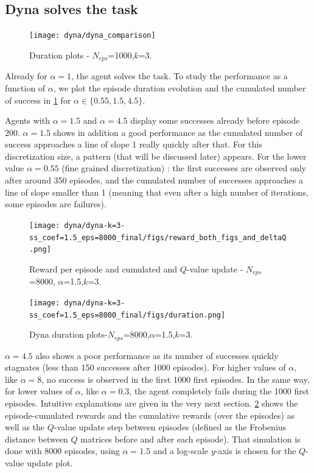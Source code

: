 \documentclass[a4paper, 12pt,oneside]{article}
\begin{document}
        \subsection{Dyna solves the task}
        \begin{figure}
            \centering
            \vspace{-3em}
            \texttt{[image: dyna/dyna\_comparison]}
            \caption{Duration plots - $N_{eps}$=1000,$k$=3.  }
            \label{dyna-comparison}
        \end{figure}
        Already for $\alpha=1$, the agent solves the task. 
        To study the performance as a function of $\alpha$, we plot the episode duration evolution and the cumulated number of success in \ref{dyna-comparison} for $\alpha\in\{0.55,1.5,4.5\}$. 
        
        Agents with $\alpha=1.5$ and $\alpha=4.5$ display some successes already before episode 200. $\alpha=1.5$ shows in addition a good performance as the cumulated number of success approaches a line of slope 1 really quickly after that. For this discretization size, a pattern (that will be discussed later) appears. For the lower value $\alpha=0.55$ (fine grained discretization) : the first successes are observed only after around 350 episodes, and the cumulated number of successes approaches a line of slope smaller than 1 (meaning that even after a high number of iterations, some episodes are failures). 
        \begin{figure}[h]
            \centering
            \texttt{[image: dyna/dyna-k=3-ss\_coef=1.5\_eps=8000\_final/figs/reward\_both\_figs\_and\_deltaQ.png]}
            \caption{Reward per episode and cumulated and $Q$-value update - $N_{eps}$=8000, $\alpha$=1.5,$k$=3.}
            \label{fig:reward-both-figs-and-deltaQ}
        \end{figure}

        \begin{figure}
            \centering
            \texttt{[image: dyna/dyna-k=3-ss\_coef=1.5\_eps=8000\_final/figs/duration.png]}
            \caption{Dyna duration plots-$N_{eps}$=8000,$\alpha$=1.5,$k$=3.}
            \label{long-duration}
        \end{figure}
        $\alpha=4.5$ also shows a poor performance as its number of successes quickly stagnates (less than 150 successes after 1000 episodes). 
        For higher values of $\alpha$, like $\alpha=8$, no success is observed in the first 1000 first episodes. In the same way, for lower values of $\alpha$, like $\alpha=0.3$, the agent completely fails during the 1000 first episodes. Intuitive explanations are given in the very next section.  
        \ref{fig:reward-both-figs-and-deltaQ} shows the episode-cumulated rewards and the cumulative rewards (over the episodes) as well as the $Q$-value update step between episodes (defined as the Frobenius distance between $Q$ matrices before and after each episode). That simulation is done with 8000 episodes, using $\alpha=1.5$ and a log-scale $y$-axis is chosen for the $Q$-value update plot.
\end{document}
